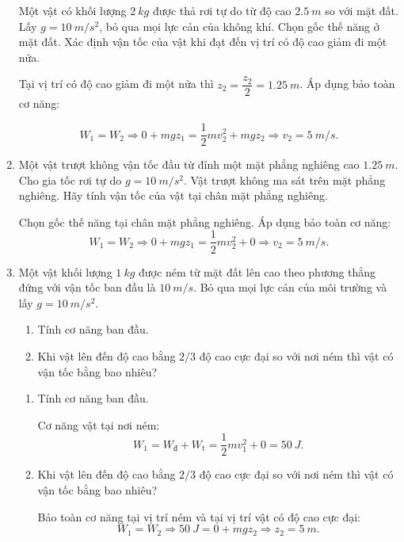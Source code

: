 \begin{enumerate}[label=\bfseries Câu \arabic*:, leftmargin=1.5cm]
	
	{
		Một vật có khối lượng $\SI{2}{kg}$ được thả rơi tự do từ độ cao $\SI{2.5}{m}$ so với mặt đất. Lấy $g=\SI{10}{m/s^2}$, bỏ qua mọi lực cản của không khí. Chọn gốc thế năng ở mặt đất. Xác định vận tốc của vật khi đạt đến vị trí có độ cao giảm đi một nửa.
	}
	
	\hideall
	{	
		Tại vị trí có độ cao giảm đi một nửa thì $z_2=\dfrac{z_2}{2} = \SI{1.25}{m}$. Áp dụng bảo toàn cơ năng:
		
		$$W_1 = W_2 \Rightarrow 0 + mgz_1 = \dfrac{1}{2}mv_2^2 + mgz_2 \Rightarrow v_2 = \SI{5}{m/s}.$$
	}

	
	
	\item {}
	
	
	{
		Một vật trượt không vận tốc đầu từ đỉnh một mặt phẳng nghiêng cao $\SI{1.25}{m}$. Cho gia tốc rơi tự do $g=\SI{10}{m/s^2}$. Vật trượt không ma sát trên mặt phẳng nghiêng. Hãy tính vận tốc của vật tại chân mặt phẳng nghiêng.
	}
	
	\hideall
	{	
		Chọn gốc thế năng tại chân mặt phẳng nghiêng. Áp dụng bảo toàn cơ năng:
		$$W_1 = W_2 \Rightarrow 0 + mgz_1 = \dfrac{1}{2}mv_2^2 + 0 \Rightarrow v_2 = \SI{5}{m/s}.$$
	}
	\item {}
	
	
	{
		Một vật khối lượng $\SI{1}{kg}$ được ném từ mặt đất lên cao theo phương thẳng đứng với vận tốc ban đầu là $\SI{10}{m/s}$. Bỏ qua mọi lực cản của môi trường và lấy $g=\SI{10}{m/s^2}$.
		\begin{enumerate}[label=\alph*)]
			\item Tính cơ năng ban đầu.
			\item Khi vật lên đến độ cao bằng $2/3$ độ cao cực đại so với nơi ném thì vật có vận tốc bằng bao nhiêu?
		\end{enumerate}
	}
	
	\hideall
	{	
		
		\begin{enumerate}[label=\alph*)]
			\item Tính cơ năng ban đầu.
			
			Cơ năng vật tại nơi ném:
			$$W_1=W_\text{đ} + W_\text{t} = \dfrac{1}{2}mv_1^2 + 0 = \SI{50}{J}.$$
			\item Khi vật lên đến độ cao bằng $2/3$ độ cao cực đại so với nơi ném thì vật có vận tốc bằng bao nhiêu?
			
			Bảo toàn cơ năng tại vị trí ném và tại vị trí vật có độ cao cực đại:
			$$W_1 = W_2 \Rightarrow \SI{50}{J} = 0 + mgz_2 \Rightarrow z_2 = \SI{5}{m}.$$
			

\end{enumerate}}
\end{enumerate}
